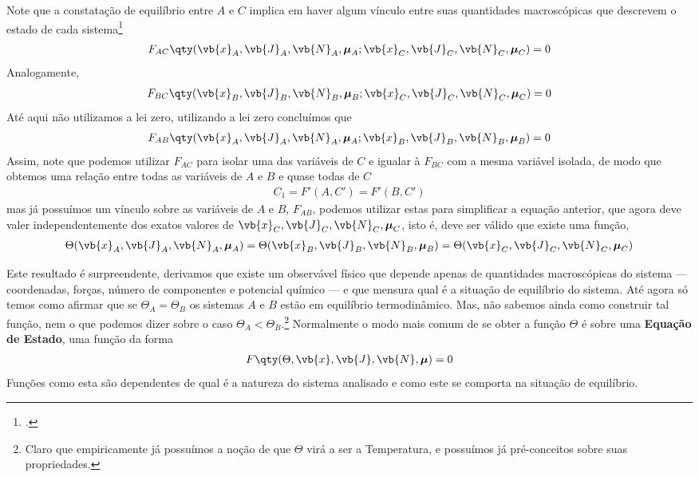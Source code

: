 \documentclass[twoside,reqno]{amsart}
\numberwithin{equation}{section}
\begin{document}
\begin{refsection}
Note que a constatação de equilíbrio entre $A$ e $C$ implica em haver algum vínculo entre suas 
quantidades macroscópicas que descrevem o estado de cada sistema\footcite{kardar} 
\begin{align}F_{AC}\qty(\vb{x}_A,\vb{J}_A,\vb{N}_A,\boldsymbol{\mu}_A;\vb{x}_C,\vb{J}_C,\vb{N}_C,\boldsymbol{\mu}_C)=0\end{align} Analogamente, 
\begin{align}F_{BC}\qty(\vb{x}_B,\vb{J}_B,\vb{N}_B,\boldsymbol{\mu}_B;\vb{x}_C,\vb{J}_C,\vb{N}_C,\boldsymbol{\mu}_C)=0\end{align} Até aqui não utilizamos a 
lei zero, utilizando a lei zero concluímos que \begin{align}F_{AB}\qty(\vb{x}_A,\vb{J}_A,\vb{N}_A,\boldsymbol{\mu}_A;\vb{x}_B,\vb{J}_B,\vb{N}_B,\boldsymbol{\mu}_B)=0\end{align} Assim, note que podemos utilizar $F_{AC}$ para isolar uma das 
variáveis de $C$ e igualar à $F_{BC}$ com a mesma variável isolada, de modo que obtemos uma relação entre todas as 
variáveis de $A$ e $B$ e quase todas de $C$ \begin{align}C_1=F'(A,C')=F'(B,C')\end{align} mas já possuímos um vínculo sobre as variáveis de 
$A$ e $B$, $F_{AB}$, podemos utilizar estas para simplificar a equação anterior, que agora deve valer independentemente dos exatos valores de $\vb{x}_C,\vb{J}_C,\vb{N}_C,\boldsymbol{\mu}_C$, isto é, deve ser válido que existe uma função, \begin{align}\Theta(\vb{x}_A,\vb{J}_A,\vb{N}_A,\boldsymbol{\mu}_A)=\Theta(\vb{x}_B,\vb{J}_B,\vb{N}_B,\boldsymbol{\mu}_B)=\Theta(\vb{x}_C,\vb{J}_C,\vb{N}_C,\boldsymbol{\mu}_C)\end{align}

Este resultado é surpreendente, derivamos que existe um observável físico que depende apenas de 
quantidades macroscópicas do sistema --- coordenadas, forças, número de componentes e potencial químico --- e que mensura qual é a situação de equilíbrio do sistema. Até agora só temos como 
afirmar que se $\Theta_A=\Theta_B$ os sistemas $A$ e $B$ estão em equilíbrio termodinâmico. Mas, 
não sabemos ainda como construir tal função, nem o que podemos dizer sobre o caso $\Theta_A<\Theta_B$.\footnote{Claro que empiricamente já possuímos a noção de que $\Theta$ virá a ser a Temperatura, e possuímos já pré-conceitos sobre suas propriedades.} Normalmente o modo 
mais comum de se obter a função $\Theta$ é sobre uma \textbf{Equação de Estado}, uma função da 
forma \begin{align}F\qty(\Theta,\vb{x},\vb{J},\vb{N},\boldsymbol{\mu})=0\end{align} Funções como 
esta são dependentes de qual é a natureza do sistema analisado e como este se comporta na
situação de equilíbrio.


\end{refsection}
\end{document}
